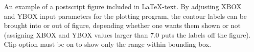 \documentclass[12pt]{article}
\begin{document}

\vspace*{4mm}

 An example of a postscript figure included in 
LaTeX-text. By adjusting XBOX and YBOX input parameters for the plotting 
program, the contour labels can be brought into or out of figure, depending 
whether one wants them shown or not (assigning XBOX and YBOX values larger 
than 7.0 puts the labels off the figure). Clip option must be on to show 
only the range within bounding box.
\end{document}

